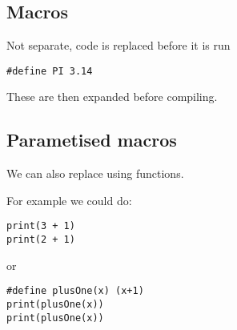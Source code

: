 \subsection{Macros}

Not separate, code is replaced before it is run

\begin{verbatim}
#define PI 3.14
\end{verbatim}

These are then expanded before compiling.

\subsection{Parametised macros}

We can also replace using functions. 

For example we could do:

\begin{verbatim}
print(3 + 1)
print(2 + 1)
\end{verbatim}

or

\begin{verbatim}
#define plusOne(x) (x+1)
print(plusOne(x))
print(plusOne(x))
\end{verbatim}



